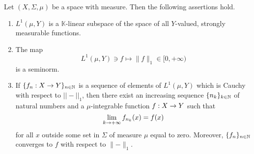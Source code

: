 \begin{theorem}[Riesz]\label{theorem:riesz_theorem}
Let $(X,\Sigma,\mu)$ be a space with measure. Then the following assertions hold.
\begin{enumerate}[label=\emph{\textbf{(\arabic*)}}, leftmargin=*]
\item $L^1(\mu,Y)$ is a $\mathbb{K}$-linear subspace of the space of all $Y$-valued, strongly measurable functions.
\item The map
$$L^1(\mu,Y)\ni f \mapsto \lVert f \rVert_1\in [0,+\infty)$$
is a seminorm.
\item If $\{f_n:X\rightarrow Y\}_{n\in {\mathbb N}}$ is a sequence of elements of $L^1(\mu,Y)$ which is Cauchy with respect to $||-||_1$, then there exist an increasing sequence $\{n_k\}_{k\in {\mathbb N}}$ of natural numbers and a $\mu$-integrable function $f:X\rightarrow Y$ such that
$$\lim_{k\rightarrow +\infty}f_{n_k}(x) = f(x)$$
for all $x$ outside some set in $\Sigma$ of measure $\mu$ equal to zero. Moreover, $\{f_n\}_{n\in {\mathbb N}}$ converges to $f$ with respect to $\lVert-\rVert_1$.
\end{enumerate}
\end{theorem}
